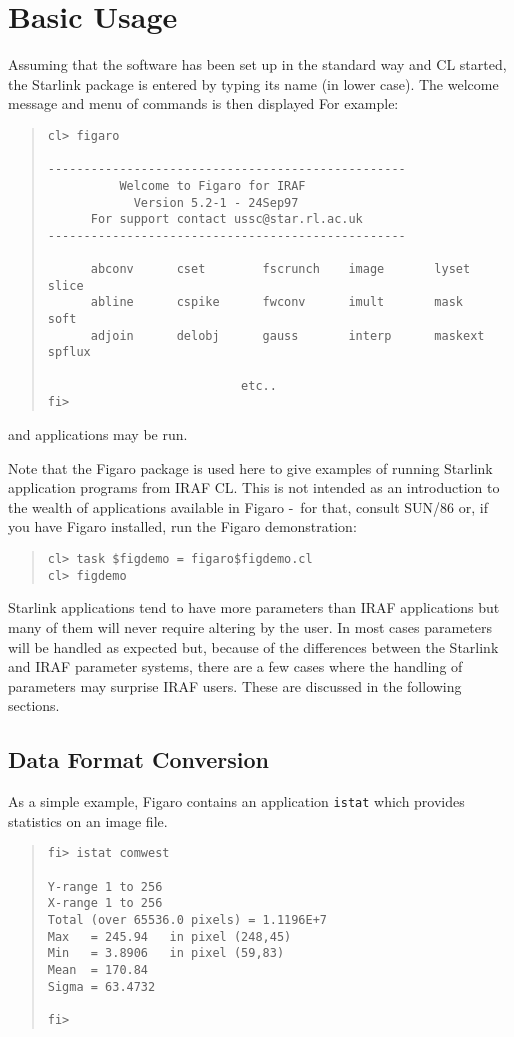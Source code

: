 \documentclass[twoside,11pt]{article}
\newcommand{\xref}[3]{#1}
\newcommand{\xlabel}[1]{}
\newcommand{\dash}{--}
\renewcommand{\dash}{-}
\begin{document}
\section{\xlabel{basic_usage}Basic Usage}
Assuming that the software has been set up in the standard way and CL started,
the Starlink package is entered by typing its name (in lower case). The welcome
message and menu of commands is then displayed
For example:
\begin{quote} \begin{verbatim}
cl> figaro

--------------------------------------------------
          Welcome to Figaro for IRAF
            Version 5.2-1 - 24Sep97
      For support contact ussc@star.rl.ac.uk
--------------------------------------------------

      abconv      cset        fscrunch    image       lyset       slice
      abline      cspike      fwconv      imult       mask        soft
      adjoin      delobj      gauss       interp      maskext     spflux

                           etc.. 
fi>
\end{verbatim} \end{quote}
and applications may be run.

Note that the Figaro package is used here to give examples of running Starlink
application programs from IRAF CL. This is not intended as an introduction to
the wealth of applications available in Figaro \dash\ for that, consult
\xref{SUN/86}{sun86}{}
or, if you have Figaro installed, run the Figaro demonstration:
\begin{quote} \begin{verbatim}
cl> task $figdemo = figaro$figdemo.cl
cl> figdemo
\end{verbatim} \end{quote}

Starlink applications tend to have more parameters than IRAF applications but
many of them will never require altering by the user.
In most cases parameters will be handled as expected but, because of the 
differences between the Starlink and IRAF parameter systems, there are a few 
cases where the handling of parameters may surprise IRAF users. 
These are discussed in the following sections.

\subsection{\xlabel{data_format_conversion}Data Format Conversion}
As a simple example, Figaro contains an application \texttt{istat} which 
provides statistics on an image file.
\begin{quote} \begin{verbatim}
fi> istat comwest

Y-range 1 to 256
X-range 1 to 256
Total (over 65536.0 pixels) = 1.1196E+7
Max   = 245.94   in pixel (248,45)
Min   = 3.8906   in pixel (59,83)
Mean  = 170.84
Sigma = 63.4732

fi>
\end{verbatim} \end{quote}
\end{document}

